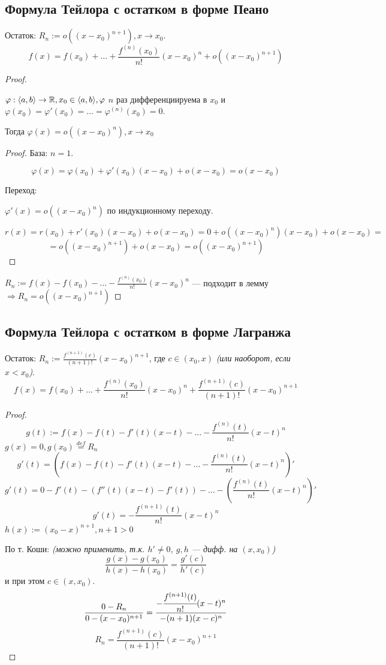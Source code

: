 \subsection{Формула Тейлора с остатком в форме Пеано}
Остаток: $R_n:=o((x-x_0)^{n+1}), x\to x_0$.
$$f(x)=f(x_0)+\ldots+\frac{f^{(n)}(x_0)}{n!}(x-x_0)^n+o((x-x_0)^{n+1})$$
\begin{proof}
    \begin{lemma}
        $\varphi:\langle a,b \rangle \to \mathbb{R}, x_0 \in \langle a,b \rangle, \varphi$ $n$ раз дифференциируема в $x_0$ и $\varphi(x_0)=\varphi'(x_0)=\ldots=\varphi^{(n)}(x_0)=0$.
        
        Тогда $\varphi(x)=o((x-x_0)^n), x\to x_0$
        \begin{proof}
            База: $n=1$.

            $$\varphi(x)=\varphi(x_0)+\varphi'(x_0)(x-x_0)+o(x-x_0)=o(x-x_0)$$

            Переход:

            $\varphi'(x)=o((x-x_0)^n)$ по индукционному переходу.

            $$r(x)=r(x_0)+r'(x_0)(x-x_0)+o(x-x_0)=0+o((x-x_0)^n)(x-x_0)+o(x-x_0)=$$
            $$=o((x-x_0)^{n+1})+o(x-x_0)=o((x-x_0)^{n+1})$$
        \end{proof}
    \end{lemma}

    $R_n:=f(x)-f(x_0)-\ldots-\frac{f^{(n)}(x_0)}{n!}(x-x_0)^n$ --- подходит в лемму $\Rightarrow R_n=o((x-x_0)^{n+1})$
\end{proof}

\subsection{\teormin Формула Тейлора с остатком в форме Лагранжа}
Остаток: $R_n:=\frac{f^{(n+1)}(c)}{(n+1)!}(x-x_0)^{n+1}$, где $c\in(x_0, x)$ \textit{(или наоборот, если $x<x_0$)}.
$$f(x)=f(x_0)+\ldots+\frac{f^{(n)}(x_0)}{n!}(x-x_0)^n+\frac{f^{(n+1)}(c)}{(n+1)!}(x-x_0)^{n+1}$$
\begin{proof}
    $$g(t):=f(x)-f(t)-f'(t)(x-t)-\ldots-\frac{f^{(n)}(t)}{n!}(x-t)^n$$
    $g(x)=0, g(x_0)\stackrel{def}{=}R_n$
    $$g'(t)=\left(f(x)-f(t)-f'(t)(x-t)-\ldots-\frac{f^{(n)}(t)}{n!}(x-t)^n\right)'$$
    $$g'(t)=0-f'(t)-(f''(t)(x-t)-f'(t))-\ldots-\left(\frac{f^{(n)}(t)}{n!}(x-t)^n\right)'$$
    $$g'(t)=-\frac{f^{(n+1)}(t)}{n!}(x-t)^n$$
    $h(x):=(x_0-x)^{n+1}, n+1>0$

    По т. Коши: \textit{(можно применить, т.к. $h'\not=0$, $g,h$ --- дифф. на $(x,x_0)$)}
    $$\frac{g(x)-g(x_0)}{h(x)-h(x_0)}=\frac{g'(c)}{h'(c)}$$
    и при этом $c\in(x,x_0)$.
    $$\frac{0-R_n}{0-(x-x_0)^{n+1}}=\frac{-\cfrac{f^{(n+1)}(t)}{n!}(x-t)^n}{-(n+1)(x-c)^n}$$
    $$R_n=\frac{f^{(n+1)}(c)}{(n+1)!}(x-x_0)^{n+1}$$
\end{proof}

